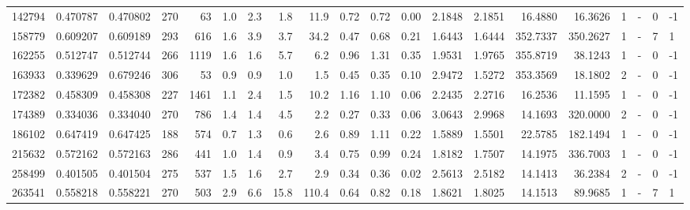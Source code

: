 \begin{tabular}{rrrrrrrrrrrrrrrrrlrl}
    142794 & 0.470787 &   0.470802 &  270 &   63 &      1.0 &      2.3 &     1.8 &     11.9 &       0.72 &        0.72 &        0.00 &  2.1848 &  2.1851 &   16.4880 &   16.3626 &       1 &             - &        0 &        -1 \\
    158779 & 0.609207 &   0.609189 &  293 &  616 &      1.6 &      3.9 &     3.7 &     34.2 &       0.47 &        0.68 &        0.21 &  1.6443 &  1.6444 &  352.7337 &  350.2627 &       1 &             - &        7 &         1 \\
    162255 & 0.512747 &   0.512744 &  266 & 1119 &      1.6 &      1.6 &     5.7 &      6.2 &       0.96 &        1.31 &        0.35 &  1.9531 &  1.9765 &  355.8719 &   38.1243 &       1 &             - &        0 &        -1 \\
    163933 & 0.339629 &   0.679246 &  306 &   53 &      0.9 &      0.9 &     1.0 &      1.5 &       0.45 &        0.35 &        0.10 &  2.9472 &  1.5272 &  353.3569 &   18.1802 &       2 &             - &        0 &        -1 \\
    172382 & 0.458309 &   0.458308 &  227 & 1461 &      1.1 &      2.4 &     1.5 &     10.2 &       1.16 &        1.10 &        0.06 &  2.2435 &  2.2716 &   16.2536 &   11.1595 &       1 &             - &        0 &        -1 \\
    174389 & 0.334036 &   0.334040 &  270 &  786 &      1.4 &      1.4 &     4.5 &      2.2 &       0.27 &        0.33 &        0.06 &  3.0643 &  2.9968 &   14.1693 &  320.0000 &       2 &             - &        0 &        -1 \\
    186102 & 0.647419 &   0.647425 &  188 &  574 &      0.7 &      1.3 &     0.6 &      2.6 &       0.89 &        1.11 &        0.22 &  1.5889 &  1.5501 &   22.5785 &  182.1494 &       1 &             - &        0 &        -1 \\
    215632 & 0.572162 &   0.572163 &  286 &  441 &      1.0 &      1.4 &     0.9 &      3.4 &       0.75 &        0.99 &        0.24 &  1.8182 &  1.7507 &   14.1975 &  336.7003 &       1 &             - &        0 &        -1 \\
    258499 & 0.401505 &   0.401504 &  275 &  537 &      1.5 &      1.6 &     2.7 &      2.9 &       0.34 &        0.36 &        0.02 &  2.5613 &  2.5182 &   14.1413 &   36.2384 &       2 &             - &        0 &        -1 \\
    263541 & 0.558218 &   0.558221 &  270 &  503 &      2.9 &      6.6 &    15.8 &    110.4 &       0.64 &        0.82 &        0.18 &  1.8621 &  1.8025 &   14.1513 &   89.9685 &       1 &             - &        7 &         1 \\

\end{tabular}
